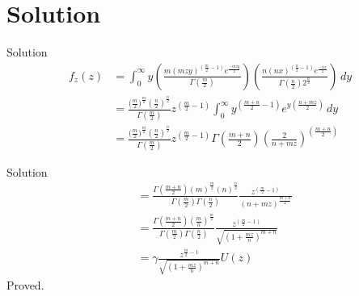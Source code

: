 \documentclass{beamer}
\begin{document}
\section{Solution}
\begin{frame}{Solution}
\begin{align}
    f_z(z)&=\int_{0}^{\infty} y \left(\frac{m{(mzy)^{(\frac{m}{2}-1)}} e^{\frac{-mzy}{2}}}{\Gamma(\frac{m}{2})}\right) \left(\frac{n{(nx)^{(\frac{n}{2}-1)}} e^{\frac{-nx}{2}}}{\Gamma(\frac{n}{2}) 2^{\frac{n}{2}}}\right)\,dy\\\
          &=\frac{({\frac{m}{2})}^{\frac{m}{2}} {(\frac{n}{2})}^{\frac{n}{2}}}{\Gamma {(\frac{m}{2})} } z^{(\frac{m}{2}-1)} \int_{0}^{\infty} y^{(\frac{m+n}{2}-1)} e^{y{(\frac{n+mz}{2})}} \,dy\\\
          &=\frac{({\frac{m}{2})}^{\frac{m}{2}} {(\frac{n}{2})}^{\frac{n}{2}}}{\Gamma {(\frac{m}{2})} } z^{(\frac{m}{2}-1)} \Gamma{\left(\frac{m+n}{2}\right)} {\left(\frac{2}{n+mz}\right)^{(\frac{m+n}{2})}}
\end{align}
\end{frame}
 \begin{frame}{Solution}
 \begin{align}
    &=\frac{\Gamma{(\frac{m+n}{2})} {(m)^{\frac{m}{2}}} {(n)^{\frac{n}{2}}}}{\Gamma{(\frac{m}{2})} \Gamma{(\frac{n}{2})}} \frac{z^{(\frac{m}{2}-1)}}{(n+mz)^\frac{m+n}{2}}\\
          &=\frac{\Gamma{(\frac{m+n}{2})} {(\frac{m}{n})^{\frac{m}{2}}}
          }{\Gamma{(\frac{m}{2})} \Gamma{(\frac{n}{2})}} \frac{z^{(\frac{m}{2}-1)}} {\sqrt{(1+\frac{mz}{n})^{m+n}}}\\
          &=\gamma \frac{z^{\frac{m}{2}-1}}{\sqrt{(1+\frac{mz}{n})^{m+n}}} U(z) 
 \end{align}
  Proved.  
 \end{frame}
\end{document}
